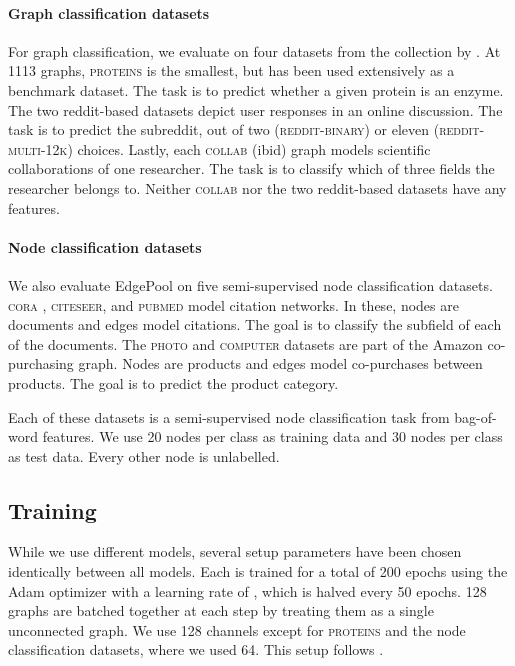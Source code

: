 \documentclass{article}
\newcommand{\edgepool}{EdgePool}
\newcommand{\datasetname}[1]{\textsc{#1}}
\newcommand{\proteins}{\datasetname{proteins}}
\newcommand{\redditbinary}{\datasetname{reddit-binary}}
\newcommand{\reddittwelve}{\datasetname{reddit-multi-12k}}
\newcommand{\collab}{\datasetname{collab}}
\newcommand{\cora}{\datasetname{cora}}
\newcommand{\citeseer}{\datasetname{citeseer}}
\newcommand{\pubmed}{\datasetname{pubmed}}
\newcommand{\photo}{\datasetname{photo}}
\newcommand{\computer}{\datasetname{computer}}
\begin{document}
\paragraph{Graph classification datasets}

For graph classification, we evaluate on four datasets from the collection by \citet{KKMMN2016}. At 1113 graphs, \proteins{} \citep{borgwardtProteinFunctionPrediction2005} is the smallest, but has been used extensively as a benchmark dataset. The task is to predict whether a given protein is an enzyme. The two reddit-based datasets \citep{yanardagDeepGraphKernels2015} depict user responses in an online discussion. The task is to predict the subreddit, out of two (\redditbinary{}) or eleven (\reddittwelve{}) choices. Lastly, each \collab{} (ibid) graph models scientific collaborations of one researcher. The task is to classify which of three fields the researcher belongs to. Neither \collab{} nor the two reddit-based datasets have any features.

\paragraph{Node classification datasets}
We also evaluate \edgepool{} on five semi-supervised node classification datasets. \cora{} \citep{namataQuerydrivenActiveSurveying2012}, \citeseer{}, and \pubmed{} \citep{senCollectiveClassificationNetwork2008} model citation networks. In these, nodes are documents and edges model citations. The goal is to classify the subfield of each of the documents. The \photo{} and \computer{} datasets \citep{shchurPitfallsGraphNeural2018} are part of the Amazon co-purchasing graph. Nodes are products and edges model co-purchases between products. The goal is to predict the product category.

Each of these datasets is a semi-supervised node classification task from bag-of-word features. We use 20 nodes per class as training data and 30 nodes per class as test data. Every other node is unlabelled.


\subsection{Training}

While we use different models, several setup parameters have been chosen identically between all models. Each is trained for a total of 200 epochs using the Adam optimizer \citep{Kingma2014} with a learning rate of , which is halved every 50 epochs. 128 graphs are batched together at each step by treating them as a single unconnected graph. We use 128 channels except for \proteins{} and the node classification datasets, where we used 64. This setup follows \citet{yingHierarchicalGraphRepresentation2018}.
\end{document}
